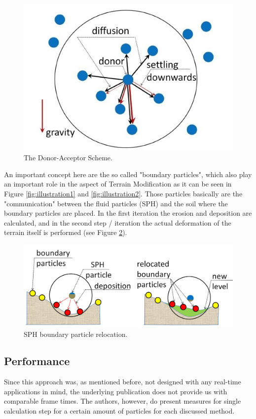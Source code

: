 \begin{figure}[htb]
	\centering
	\includegraphics[width=\linewidth]{KBKS09/donoracceptor.jpg}
	\caption{The Donor-Acceptor Scheme.}
	\label{fig:donoracceptor}
\end{figure}

An important concept here are the so called "boundary particles", which also play an important role in the aspect of Terrain Modification as it can be seen in Figure \ref{fig:illustration1} and \ref{fig:illustration2}. Those particles basically are the "communication" between the fluid particles (SPH) and the soil where the boundary particles are placed. In the first iteration the erosion and deposition are calculated, and in the second step / iteration the actual deformation of the terrain itself is performed (see Figure \ref{fig:boundary2}). 

\begin{figure}[htb]
	\centering
	\includegraphics[width=\linewidth]{KBKS09/boundary2.jpg}
	\caption{SPH boundary particle relocation.}
	\label{fig:boundary2}
\end{figure}

\subsection{Performance}
Since this approach was, as mentioned before, not designed with any real-time applications in mind, the underlying publication does not provide us with comparable frame times. The authors, however, do present measures for single calculation step  for a certain amount of particles for each discussed method.

